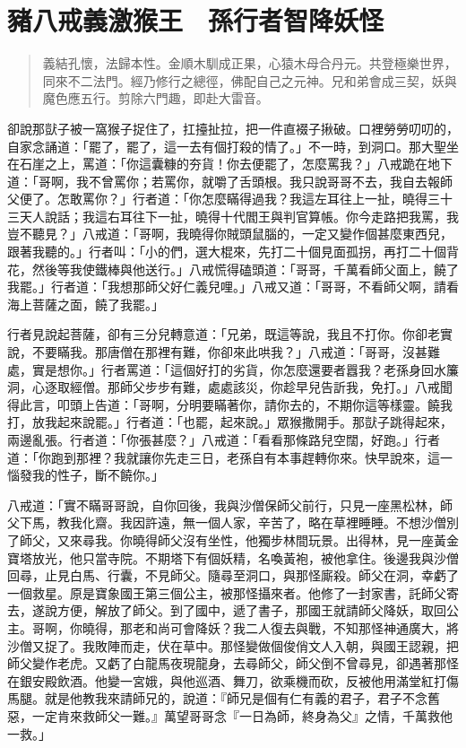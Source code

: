 
\chapter{豬八戒義激猴王　孫行者智降妖怪}

\begin{quote}
義結孔懷，法歸本性。金順木馴成正果，心猿木母合丹元。共登極樂世界，同來不二法門。經乃修行之總徑，佛配自己之元神。兄和弟會成三契，妖與魔色應五行。剪除六門趣，即赴大雷音。
\end{quote}

卻說那獃子被一窩猴子捉住了，扛擡扯拉，把一件直裰子揪破。口裡勞勞叨叨的，自家念誦道：「罷了，罷了，這一去有個打殺的情了。」不一時，到洞口。那大聖坐在石崖之上，罵道：「你這囊糠的夯貨！你去便罷了，怎麼罵我？」八戒跪在地下道：「哥啊，我不曾罵你；若罵你，就嚼了舌頭根。我只說哥哥不去，我自去報師父便了。怎敢罵你？」行者道：「你怎麼瞞得過我？我這左耳往上一扯，曉得三十三天人說話；我這右耳往下一扯，曉得十代閻王與判官算帳。你今走路把我罵，我豈不聽見？」八戒道：「哥啊，我曉得你賊頭鼠腦的，一定又變作個甚麼東西兒，跟著我聽的。」行者叫：「小的們，選大棍來，先打二十個見面孤拐，再打二十個背花，然後等我使鐵棒與他送行。」八戒慌得磕頭道：「哥哥，千萬看師父面上，饒了我罷。」行者道：「我想那師父好仁義兒哩。」八戒又道：「哥哥，不看師父啊，請看海上菩薩之面，饒了我罷。」

行者見說起菩薩，卻有三分兒轉意道：「兄弟，既這等說，我且不打你。你卻老實說，不要瞞我。那唐僧在那裡有難，你卻來此哄我？」八戒道：「哥哥，沒甚難處，實是想你。」行者罵道：「這個好打的劣貨，你怎麼還要者囂我？老孫身回水簾洞，心逐取經僧。那師父步步有難，處處該災，你趁早兒告訢我，免打。」八戒聞得此言，叩頭上告道：「哥啊，分明要瞞著你，請你去的，不期你這等樣靈。饒我打，放我起來說罷。」行者道：「也罷，起來說。」眾猴撒開手。那獃子跳得起來，兩邊亂張。行者道：「你張甚麼？」八戒道：「看看那條路兒空闊，好跑。」行者道：「你跑到那裡？我就讓你先走三日，老孫自有本事趕轉你來。快早說來，這一惱發我的性子，斷不饒你。」

八戒道：「實不瞞哥哥說，自你回後，我與沙僧保師父前行，只見一座黑松林，師父下馬，教我化齋。我因許遠，無一個人家，辛苦了，略在草裡睡睡。不想沙僧別了師父，又來尋我。你曉得師父沒有坐性，他獨步林間玩景。出得林，見一座黃金寶塔放光，他只當寺院。不期塔下有個妖精，名喚黃袍，被他拿住。後邊我與沙僧回尋，止見白馬、行囊，不見師父。隨尋至洞口，與那怪廝殺。師父在洞，幸虧了一個救星。原是寶象國王第三個公主，被那怪攝來者。他修了一封家書，託師父寄去，遂說方便，解放了師父。到了國中，遞了書子，那國王就請師父降妖，取回公主。哥啊，你曉得，那老和尚可會降妖？我二人復去與戰，不知那怪神通廣大，將沙僧又捉了。我敗陣而走，伏在草中。那怪變做個俊俏文人入朝，與國王認親，把師父變作老虎。又虧了白龍馬夜現龍身，去尋師父，師父倒不曾尋見，卻遇著那怪在銀安殿飲酒。他變一宮娥，與他巡酒、舞刀，欲乘機而砍，反被他用滿堂紅打傷馬腿。就是他教我來請師兄的，說道：『師兄是個有仁有義的君子，君子不念舊惡，一定肯來救師父一難。』萬望哥哥念『一日為師，終身為父』之情，千萬救他一救。」

